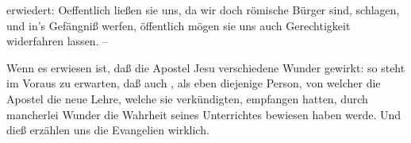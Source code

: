 \begin{aufza}
erwiedert: Oeffentlich ließen sie uns, da wir doch römische Bürger sind, schlagen, und in's Gefängniß werfen, öffentlich mögen sie uns auch Gerechtigkeit widerfahren lassen. -- 
\end{aufza}


\begin{center}\end{center}

Wenn es erwiesen ist, daß die Apostel Jesu verschiedene Wunder gewirkt: so steht im Voraus zu erwarten, daß auch , als eben diejenige Person, von welcher die Apostel die neue Lehre, welche sie verkündigten, empfangen hatten, durch mancherlei Wunder die Wahrheit seines Unterrichtes bewiesen haben werde. Und dieß erzählen uns die Evangelien wirklich.~
